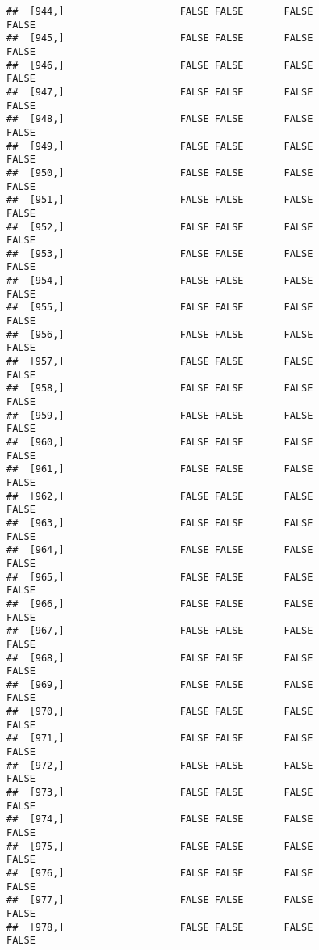 \documentclass[
]{article}
\begin{document}
\begin{verbatim}
##  [944,]                    FALSE FALSE       FALSE                FALSE
##  [945,]                    FALSE FALSE       FALSE                FALSE
##  [946,]                    FALSE FALSE       FALSE                FALSE
##  [947,]                    FALSE FALSE       FALSE                FALSE
##  [948,]                    FALSE FALSE       FALSE                FALSE
##  [949,]                    FALSE FALSE       FALSE                FALSE
##  [950,]                    FALSE FALSE       FALSE                FALSE
##  [951,]                    FALSE FALSE       FALSE                FALSE
##  [952,]                    FALSE FALSE       FALSE                FALSE
##  [953,]                    FALSE FALSE       FALSE                FALSE
##  [954,]                    FALSE FALSE       FALSE                FALSE
##  [955,]                    FALSE FALSE       FALSE                FALSE
##  [956,]                    FALSE FALSE       FALSE                FALSE
##  [957,]                    FALSE FALSE       FALSE                FALSE
##  [958,]                    FALSE FALSE       FALSE                FALSE
##  [959,]                    FALSE FALSE       FALSE                FALSE
##  [960,]                    FALSE FALSE       FALSE                FALSE
##  [961,]                    FALSE FALSE       FALSE                FALSE
##  [962,]                    FALSE FALSE       FALSE                FALSE
##  [963,]                    FALSE FALSE       FALSE                FALSE
##  [964,]                    FALSE FALSE       FALSE                FALSE
##  [965,]                    FALSE FALSE       FALSE                FALSE
##  [966,]                    FALSE FALSE       FALSE                FALSE
##  [967,]                    FALSE FALSE       FALSE                FALSE
##  [968,]                    FALSE FALSE       FALSE                FALSE
##  [969,]                    FALSE FALSE       FALSE                FALSE
##  [970,]                    FALSE FALSE       FALSE                FALSE
##  [971,]                    FALSE FALSE       FALSE                FALSE
##  [972,]                    FALSE FALSE       FALSE                FALSE
##  [973,]                    FALSE FALSE       FALSE                FALSE
##  [974,]                    FALSE FALSE       FALSE                FALSE
##  [975,]                    FALSE FALSE       FALSE                FALSE
##  [976,]                    FALSE FALSE       FALSE                FALSE
##  [977,]                    FALSE FALSE       FALSE                FALSE
##  [978,]                    FALSE FALSE       FALSE                FALSE

\end{verbatim}
\end{document}
